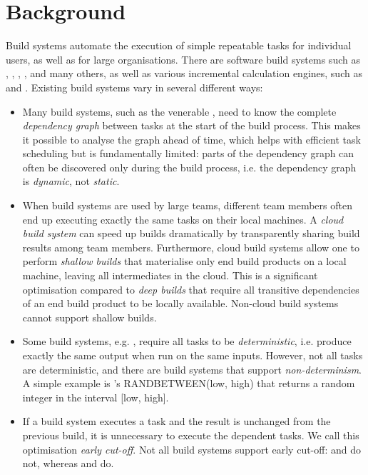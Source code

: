 \clearpage
\section{Background}\label{sec-background}

Build systems automate the execution of simple repeatable tasks for individual
users, as well as for large organisations. There are software build systems such
as \Make, \Ninja, \Shake, \Bazel, \Buck and many others, as well as various
incremental calculation engines, such as \Excel and \Calc. Existing build
systems vary in several different ways:

\begin{itemize}
    \item Many build systems, such as the venerable \Make, need to know the
    complete \emph{dependency graph} between tasks at the start of the build
    process. This makes it possible to analyse the graph ahead of time, which
    helps with efficient task scheduling but is fundamentally limited: parts of
    the dependency graph can often be discovered only during the build process,
    i.e. the dependency graph is \emph{dynamic}, not \emph{static}.

    \item When build systems are used by large teams, different team members
    often end up executing exactly the same tasks on their local machines.
    A \emph{cloud build system} can speed up builds dramatically by
    transparently sharing build results among team members. Furthermore, cloud
    build systems allow one to perform \emph{shallow builds} that materialise
    only end build products on a local machine, leaving all intermediates in the
    cloud. This is a significant optimisation compared to \emph{deep builds}
    that require all transitive dependencies of an end build product to be
    locally available. Non-cloud build systems cannot support shallow builds.

    \item Some build systems, e.g. \Buck, require all tasks to be
    \emph{deterministic}, i.e. produce exactly the same output when run on the
    same inputs. However, not all tasks are deterministic, and there are build
    systems that support \emph{non-determinism}. A simple example is \Excel's
    \textsf{RANDBETWEEN(low, high)} that returns a random integer in the
    interval \textsf{[low, high]}.

    \item If a build system executes a task and the result is unchanged from the
    previous build, it is unnecessary to execute the dependent tasks. We call
    this optimisation \emph{early cut-off}. Not all build systems support early
    cut-off: \Make and \Excel do not, whereas \Shake and \Buck do.


\end{itemize}
